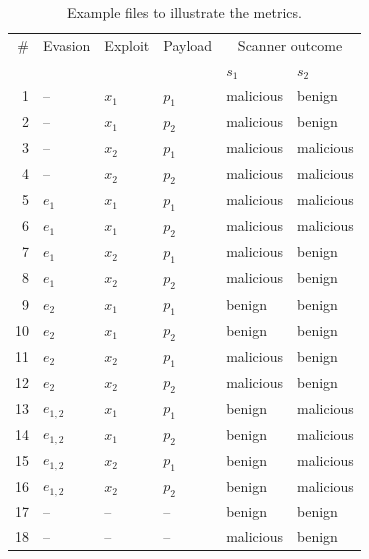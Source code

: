 \begin{table}[tb]
\centering
\caption{Example files to illustrate the metrics.}
\setlength{\tabcolsep}{7pt}
\footnotesize
\begin{tabular}{rlllll}
\toprule
\# & Evasion & Exploit & Payload & \multicolumn{2}{c}{Scanner outcome} \\
\cmidrule{5-6}
&&&& $s_1$ & $s_2$ \\
\midrule
1   &   --      &   $x_1$   &   $p_1$   &   malicious   & benign    \\
2   &   --      &   $x_1$   &   $p_2$   &   malicious   & benign    \\
3   &   --      &   $x_2$   &   $p_1$   &   malicious   & malicious    \\
4   &   --      &   $x_2$   &   $p_2$   &   malicious   & malicious    \\

5   &   $e_{1}$      &   $x_1$   &   $p_1$   &   malicious   & malicious    \\
6   &   $e_{1}$      &   $x_1$   &   $p_2$   &   malicious   & malicious    \\
7   &   $e_{1}$      &   $x_2$   &   $p_1$   &   malicious   & benign    \\
8   &   $e_{1}$      &   $x_2$   &   $p_2$   &   malicious   & benign    \\

9   &   $e_{2}$      &   $x_1$   &   $p_1$   &   benign   & benign    \\
10   &   $e_{2}$      &   $x_1$   &   $p_2$   &   benign   & benign    \\
11   &   $e_{2}$      &   $x_2$   &   $p_1$   &   malicious   & benign    \\
12   &   $e_{2}$      &   $x_2$   &   $p_2$   &   malicious   & benign    \\

13   &   $e_{1,2}$      &   $x_1$   &   $p_1$   &   benign   & malicious    \\
14   &   $e_{1,2}$      &   $x_1$   &   $p_2$   &   benign   & malicious    \\
15   &   $e_{1,2}$      &   $x_2$   &   $p_1$   &   benign   & malicious    \\
16   &   $e_{1,2}$      &   $x_2$   &   $p_2$   &   benign   & malicious    \\

17   &   --      &   --   &   --   &   benign   & benign    \\
18   &   --      &   --   &   --   &   malicious   & benign    \\

\bottomrule
\end{tabular}
\label{t:example suite}
\end{table}

